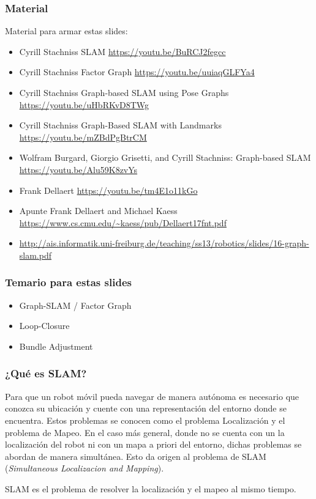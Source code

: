 \begin{frame}
	\frametitle{Material}
	
	Material para armar estas slides:
	\begin{itemize}
		\item Cyrill Stachniss SLAM \url{https://youtu.be/BuRCJ2fegcc}
   		\item Cyrill Stachniss Factor Graph \url{https://youtu.be/uuiaqGLFYa4}
		\item Cyrill Stachniss Graph-based SLAM using Pose Graphs \url{https://youtu.be/uHbRKvD8TWg}
		\item Cyrill Stachniss Graph-Based SLAM with Landmarks \url{https://youtu.be/mZBdPgBtrCM}
		\item Wolfram Burgard, Giorgio Grisetti, and Cyrill Stachniss: Graph-based SLAM \url{https://youtu.be/Alu59K8zvYs}
		\item Frank Dellaert \url{https://youtu.be/tm4E1o11kGo}
        \item Apunte Frank Dellaert and Michael Kaess \url{https://www.cs.cmu.edu/~kaess/pub/Dellaert17fnt.pdf}
        \item \url{http://ais.informatik.uni-freiburg.de/teaching/ss13/robotics/slides/16-graph-slam.pdf}
	\end{itemize}
	
\end{frame}

\begin{frame}
	\frametitle{Temario para estas slides}
	
	\begin{itemize}
		\item Graph-SLAM / Factor Graph
		\item Loop-Closure
		\item Bundle Adjustment
	\end{itemize}
	
\end{frame}

\begin{frame}
	\frametitle{¿Qué es SLAM?}
	
	Para que un robot móvil pueda navegar de manera autónoma es necesario que conozca su ubicación y cuente con una representación del entorno donde se encuentra. Estos problemas se conocen como el problema Localización y el problema de Mapeo. En el caso más general, donde no se cuenta con un la localización del robot ni con un mapa a priori del entorno, dichas problemas se abordan de manera simultánea. Esto da origen al problema de SLAM (\emph{Simultaneous Localizacion and Mapping}).
	\begin{block}{}
		SLAM es el problema de resolver la localización y el mapeo al mismo tiempo.
	\end{block}
	
\end{frame}


